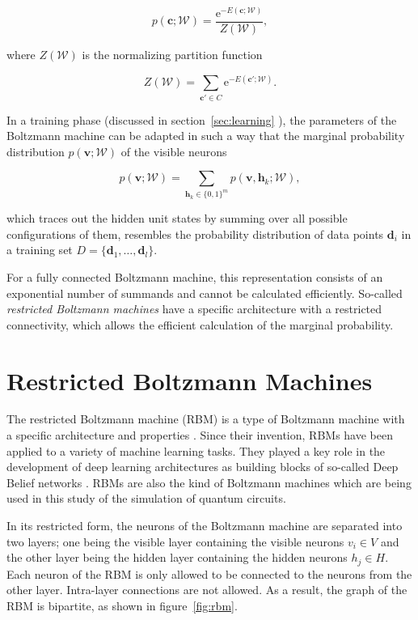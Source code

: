 \begin{equation}
   p(\bm{c};\mathcal{W}) = \frac{\mathrm{e}^{-E(\bm{c};\mathcal{W})}}{Z(\mathcal{W})},
\end{equation}

where $Z(\mathcal{W})$ is the normalizing partition function 

\begin{equation}
   Z(\mathcal{W}) = \sum_{\bm{c}\prime\in C} \mathrm{e}^{-E(\bm{c}\prime;\mathcal{W})}.
\end{equation}

In a training phase (discussed in section~\ref{sec:learning} ), the parameters of the Boltzmann machine can be adapted in such a way that 
the marginal probability distribution $p(\bm{v}; \mathcal{W})$ of the visible neurons

\begin{equation}
    \label{eq:gbm}
   p(\bm{v};\mathcal{W}) = \sum_{\bm{h}_k \in \{0,1\}^m} p(\bm{v},\bm{h}_k;\mathcal{W}),
\end{equation}

which traces out the hidden unit 
states by summing over all possible configurations of them, resembles the probability 
distribution of data points $\bm{d}_i$ in a training set $D=\{\bm{d}_1,\dots,\bm{d}_l\}$.

For a fully connected Boltzmann machine, this representation consists of an exponential number of summands and cannot be calculated efficiently. So-called \textit{restricted Boltzmann machines}
have a specific architecture with a restricted connectivity, which allows the efficient calculation of the marginal probability.

\section{Restricted Boltzmann Machines}
\label{sec:rbms}
The restricted Boltzmann machine (RBM) is a type of Boltzmann machine with 
a specific architecture and properties \cite{smolensky1986information}. Since their invention, RBMs have been applied to a variety 
of machine learning tasks. They played a 
key role in the development of deep learning architectures as building blocks of so-called 
Deep Belief networks \cite{bengio2009learning, hinton2006fast}.
RBMs are also the kind of Boltzmann machines which are being used in this study of the simulation 
of quantum circuits.

In its restricted form, the neurons of the Boltzmann machine are separated into two layers;
one being the visible layer containing the visible neurons $v_i \in V$ and the other layer being the hidden layer containing the hidden neurons $h_j \in H$. Each neuron of the RBM 
is only allowed to be connected to the neurons from the other layer. Intra-layer connections are not allowed. As a result, the graph of the RBM is bipartite, as shown in figure~\ref{fig:rbm}. 

